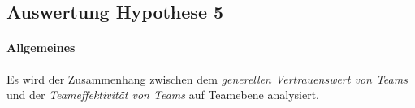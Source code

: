 \documentclass[a4paper,11pt]{article}%
\renewcommand{\\}{\vspace*{0.5\baselineskip} \newline}
\begin{document}
{{{{{{{{{\newpage
\subsection{Auswertung Hypothese 5}
\label{Auswertung Hypothese 5}
\paragraph{Allgemeines}
Es wird der Zusammenhang zwischen dem \textit{generellen Vertrauenswert von Teams} und der \textit{Teameffektivität von Teams} auf Teamebene analysiert.
 
}}}}}}}}}
\end{document}
